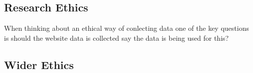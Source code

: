 \subsection{Research Ethics}

When thinking about an ethical way of conlecting data one of the key questions is should the website data is collected say the data is being used for this?

\subsection{Wider Ethics}